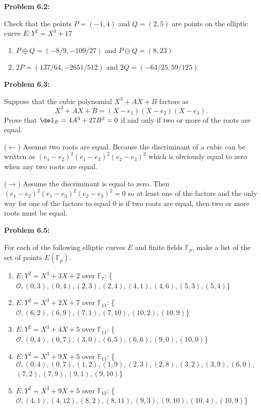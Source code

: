 \documentclass[a4paper, 11pt]{article}
\begin{document}
\noindent\textbf{Problem 6.2:}
    
    Check that the points $P=(-1,4)$ and $Q=(2,5)$ are points on the elliptic curve $E: Y^2 = X^3 +17$
    \begin{enumerate}[label=(\alph*)]
        \item $P \oplus Q = (-8/9 , -109/27)$ and $P \ominus Q = (8 , 23)$
        \item $2P = (137/64 , -2651/512)$ and $2Q = (-64/25 , 59/125)$
    \end{enumerate}

\noindent\textbf{Problem 6.3:}
    
    Suppose that the cubic polynomial $X^3 + AX + B$ factors as $$X^3 + AX + B = (X-e_1)(X-e_2)(X-e_3).$$ Prove that $\del_E = 4A^3 + 27B^2 = 0$ if and only if two or more of the roots are equal.
    
    ($\leftarrow$) Assume two roots are equal. Because the discriminant of a cubic can be written as $(e_1-e_2)^2(e_1-e_3)^2(e_2-e_3)^2$ which is obviously equal to zero when any two roots are equal.
    
    ($\rightarrow$) Assume the discriminant is equal to zero. Then $(e_1-e_2)^2(e_1-e_3)^2(e_2-e_3)^2 = 0$ so at least one of the factors and the only way for one of the factors to equal 0 is if two roots are equal, then two or more roots must be equal.
    
\noindent\textbf{Problem 6.5:}
    
    For each of the following elliptic curves $E$ and finite fields $\mathbb{F}_p$, make a list of the set of points $E(\mathbb{F}_p)$.
    \begin{enumerate}[label=(\alph*)]
        \item $E: Y^2 = X^3 + 3X + 2$ over $\mathbb{F}_7$:
        \{$\mathcal{O}, (0 , 3), (0 , 4), (2 , 3), (2 , 4), (4 , 1), (4 , 6), (5 , 3), (5 , 4)$\}
        \item $E: Y^2 = X^3 + 2X + 7$ over $\mathbb{F}_{11}$:
        \{$\mathcal{O}, (6 , 2), (6, 9), (7 , 1), (7 , 10), (10 , 2), (10 , 9)$\}
        \item $E: Y^2 = X^3 + 4X + 5$ over $\mathbb{F}_{11}$:
        \{$\mathcal{O}, (0 , 4), (0 , 7), (3 , 0), (6 , 5), (6 , 6), (9 , 0), (10 , 0)$\}
        \item $E: Y^2 = X^3 + 9X + 5$ over $\mathbb{F}_{11}$:
        \{$\mathcal{O}, (0 , 4), (0 , 7), (1 , 2), (1 , 9), (2 , 3), (2 , 8), (3 , 2), (3 , 9), (6 , 0),$ $(7 , 2), (7 , 9), (9 , 1), (9 , 10)$\}
        \item $E: Y^2 = X^3 + 9X + 5$ over $\mathbb{F}_{13}$:
        \{$\mathcal{O}, (4 , 1), (4 , 12), (8 , 2), (8 , 11), (9 , 3), (9 , 10), (10 , 4), (10 , 9)$\}
    \end{enumerate}
    
\end{document}
